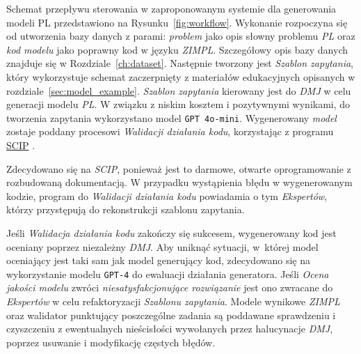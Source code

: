 Schemat przepływu sterowania w zaproponowanym systemie dla generowania modeli PL przedstawiono na Rysunku~\ref{fig:workflow}. %
Wykonanie rozpoczyna się od utworzenia bazy danych z parami: \textit{problem} jako opis słowny problemu \textit{PL} oraz \textit{kod modelu} jako poprawny kod w języku \textit{ZIMPL}. Szczegółowy opis bazy danych znajduje się w Rozdziale~\ref{ch:dataset}. Następnie tworzony jest \textit{Szablon zapytania}, który wykorzystuje schemat zaczerpnięty z materiałów edukacyjnych opisanych w rozdziale~\ref{sec:model_example}. \textit{Szablon zapytania} kierowany jest do \textit{DMJ} w celu generacji modelu \textit{PL}. W związku z niskim kosztem i pozytywnymi wynikami, do tworzenia zapytania wykorzystano model \texttt{GPT 4o-mini}. Wygenerowany \textit{model} zostaje poddany procesowi \textit{Walidacji działania kodu}, korzystając z programu \href{https://www.scipopt.org/}{SCIP} \cite{BolusaniEtal2024ZR}. %

 Zdecydowano się na \textit{SCIP}, ponieważ jest to darmowe, otwarte oprogramowanie z rozbudowaną dokumentacją. %
 W przypadku wystąpienia błędu w wygenerowanym kodzie, program do \textit{Walidacji działania kodu} powiadamia o tym \textit{Ekspertów}, którzy przystępują do rekonstrukcji szablonu zapytania.

Jeśli \textit{Walidacja działania kodu} zakończy się sukcesem, wygenerowany kod jest oceniany poprzez niezależny \textit{DMJ}. Aby uniknąć sytuacji, w~której model oceniający jest taki sam jak model generujący kod, zdecydowano się na wykorzystanie modelu \texttt{GPT-4} do ewaluacji działania generatora. Jeśli \textit{Ocena jakości modelu} zwróci \textit{niesatysfakcjonujące rozwiązanie} jest ono zwracane do \textit{Ekspertów} w celu refaktoryzacji \textit{Szablonu zapytania}. Modele wynikowe \textit{ZIMPL} oraz walidator punktujący poszczególne zadania są poddawane sprawdzeniu i czyszczeniu z ewentualnych nieścisłości wywołanych przez halucynacje \textit{DMJ}, poprzez usuwanie i modyfikację częstych błędów.


